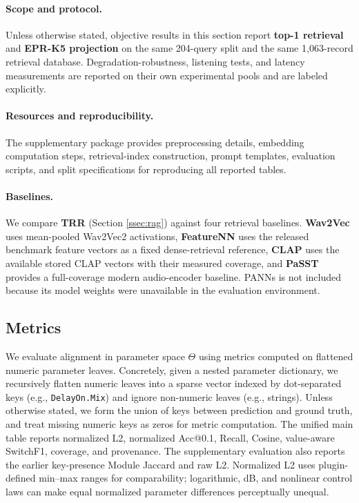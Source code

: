\paragraph{Scope and protocol.}
Unless otherwise stated, objective results in this section report \textbf{top-1 retrieval} and \textbf{EPR-K5 projection} on the same 204-query split and the same 1,063-record retrieval database. Degradation-robustness, listening tests, and latency measurements are reported on their own experimental pools and are labeled explicitly.

\paragraph{Resources and reproducibility.}
\label{sec:repro}
The supplementary package provides preprocessing details, embedding computation steps, retrieval-index construction, prompt templates, evaluation scripts, and split specifications for reproducing all reported tables.

\paragraph{Baselines.}
We compare \textbf{TRR} (Section \ref{ssec:rag}) against four retrieval baselines. \textbf{Wav2Vec} uses mean-pooled Wav2Vec2 activations, \textbf{FeatureNN} uses the released benchmark feature vectors as a fixed dense-retrieval reference, \textbf{CLAP} uses the available stored CLAP vectors with their measured coverage, and \textbf{PaSST} provides a full-coverage modern audio-encoder baseline. PANNs is not included because its model weights were unavailable in the evaluation environment.

\subsection{Metrics}
\label{ssec:metrics}
We evaluate alignment in parameter space $\Theta$ using metrics computed on flattened numeric parameter leaves. Concretely, given a nested parameter dictionary, we recursively flatten numeric leaves into a sparse vector indexed by dot-separated keys (e.g., \texttt{DelayOn.Mix}) and ignore non-numeric leaves (e.g., strings). Unless otherwise stated, we form the union of keys between prediction and ground truth, and treat missing numeric keys as zeros for metric computation. The unified main table reports normalized L2, normalized Acc@0.1, Recall, Cosine, value-aware SwitchF1, coverage, and provenance. The supplementary evaluation also reports the earlier key-presence Module Jaccard and raw L2. Normalized L2 uses plugin-defined min--max ranges for comparability; logarithmic, dB, and nonlinear control laws can make equal normalized parameter differences perceptually unequal.

